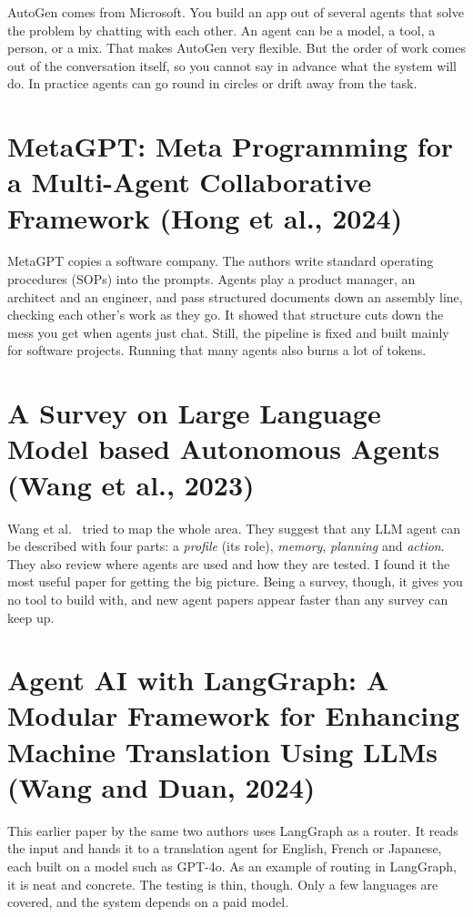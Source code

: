 \documentclass[12pt,a4paper]{report}
\begin{document}
AutoGen \cite{wu2023autogen} comes from Microsoft. You build an app out of several agents that solve the problem by chatting with each other. An agent can be a model, a tool, a person, or a mix. That makes AutoGen very flexible. But the order of work comes out of the conversation itself, so you cannot say in advance what the system will do. In practice agents can go round in circles or drift away from the task.

\section{MetaGPT: Meta Programming for a Multi-Agent Collaborative Framework (Hong et al., 2024)}

MetaGPT \cite{hong2024metagpt} copies a software company. The authors write standard operating procedures (SOPs) into the prompts. Agents play a product manager, an architect and an engineer, and pass structured documents down an assembly line, checking each other's work as they go. It showed that structure cuts down the mess you get when agents just chat. Still, the pipeline is fixed and built mainly for software projects. Running that many agents also burns a lot of tokens.

\section{A Survey on Large Language Model based Autonomous Agents (Wang et al., 2023)}

Wang et al.\ \cite{wang2023survey} tried to map the whole area. They suggest that any LLM agent can be described with four parts: a \emph{profile} (its role), \emph{memory}, \emph{planning} and \emph{action}. They also review where agents are used and how they are tested. I found it the most useful paper for getting the big picture. Being a survey, though, it gives you no tool to build with, and new agent papers appear faster than any survey can keep up.

\section{Agent AI with LangGraph: A Modular Framework for Enhancing Machine Translation Using LLMs (Wang and Duan, 2024)}

This earlier paper by the same two authors \cite{wang2024translation} uses LangGraph as a router. It reads the input and hands it to a translation agent for English, French or Japanese, each built on a model such as GPT-4o. As an example of routing in LangGraph, it is neat and concrete. The testing is thin, though. Only a few languages are covered, and the system depends on a paid model.
\end{document}
